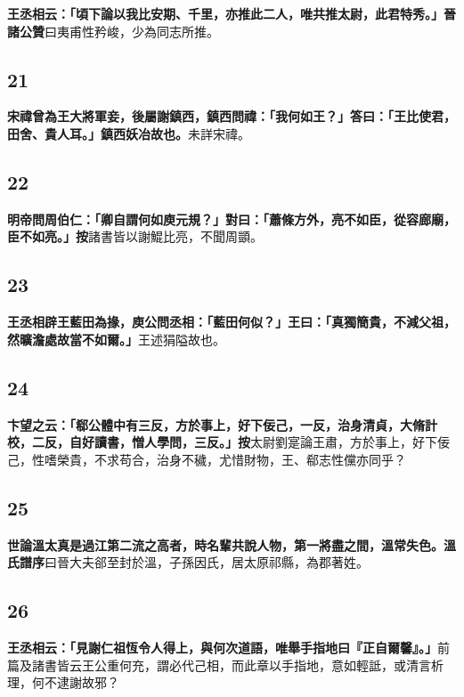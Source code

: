 \textbf{王丞相云：「頃下論以我比安期、千里，亦推此二人，唯共推太尉，此君特秀。」}{\footnotesize \textbf{晉諸公贊}曰夷甫性矜峻，少為同志所推。}

\subsection*{21}

\textbf{宋禕曾為王大將軍妾，後屬謝鎮西，鎮西問禕：「我何如王？」答曰：「王比使君，田舍、貴人耳。」鎮西妖冶故也。}{\footnotesize 未詳宋禕。}

\subsection*{22}

\textbf{明帝問周伯仁：「卿自謂何如庾元規？」對曰：「蕭條方外，亮不如臣，從容廊廟，臣不如亮。」}{\footnotesize \textbf{按}諸書皆以謝鯤比亮，不聞周顗。}

\subsection*{23}

\textbf{王丞相辟王藍田為掾，庾公問丞相：「藍田何似？」王曰：「真獨簡貴，不減父祖，然曠澹處故當不如爾。」}{\footnotesize 王述狷隘故也。}

\subsection*{24}

\textbf{卞望之云：「郗公體中有三反，方於事上，好下佞己，一反，治身清貞，大脩計校，二反，自好讀書，憎人學問，三反。」}{\footnotesize \textbf{按}太尉劉寔論王肅，方於事上，好下佞己，性嗜榮貴，不求苟合，治身不穢，尤惜財物，王、郗志性儻亦同乎？}

\subsection*{25}

\textbf{世論溫太真是過江第二流之高者，時名輩共說人物，第一將盡之間，溫常失色。}{\footnotesize \textbf{溫氏譜序}曰晉大夫郤至封於溫，子孫因氏，居太原祁縣，為郡著姓。}

\subsection*{26}

\textbf{王丞相云：「見謝仁祖恆令人得上，與何次道語，唯舉手指地曰『正自爾馨』。」}{\footnotesize 前篇及諸書皆云王公重何充，謂必代己相，而此章以手指地，意如輕詆，或清言析理，何不逮謝故邪？}

